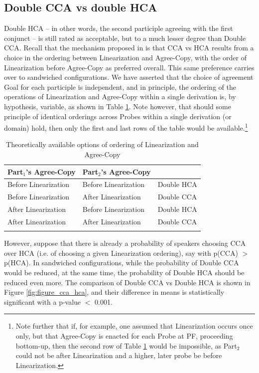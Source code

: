 \documentclass[output=paper
,modfonts
,nonflat]{langsci/langscibook}
\begin{document}
\subsection{Double CCA vs double HCA}
Double HCA -- in other words, the second participle agreeing with the first conjunct -- is still rated as acceptable, but to a much lesser degree than Double CCA.  Recall that the mechanism proposed in \citet{marusicnevinsbadecker:15} is that CCA vs HCA results from a choice in the ordering between Linearization and Agree-Copy, with the order of Linearization before Agree-Copy as preferred overall. This same preference carries over to sandwiched configurations. We have asserted that the choice of agreement Goal for each participle is independent, and in principle, the ordering of the operations of Linearization and Agree-Copy within a single derivation is, by hypothesis, variable, as shown in Table \ref{tab:order}. Note however, that should some principle of identical orderings across Probes within a single derivation (or domain) hold, then only the first and last rows of the table would be available.\footnote{Note further that if, for example, one assumed that Linearization occurs once only, but that Agree-Copy is enacted for each Probe at PF, proceeding bottom-up, then the second row of Table \ref{tab:order} would be impossible, as Part$_2$ could not be after Linearization and a higher, later probe be before Linearization.}

\begin{table}
\begin{tabularx}{\textwidth}{XXX} 
	\lsptoprule
Part$_1$'s Agree-Copy &  Part$_2$'s Agree-Copy &\\ \midrule
Before Linearization & Before Linearization & Double HCA\\ \midrule
Before Linearization & After Linearization& Double CCA\\ \midrule
After Linearization & Before Linearization& Double HCA\\ \midrule
After Linearization & After Linearization& Double CCA\\ 
\lspbottomrule
\end{tabularx}
\caption{Theoretically available options of ordering of Linearization and Agree-Copy}
\label{tab:order}
\end{table}
\newpage\noindent However, suppose that there is already a probability of speakers choosing CCA over HCA (i.e. of choosing a given Linearization ordering), say with p(CCA) $>$ p(HCA). In sandwiched configurations, while the probability of Double CCA would be reduced, at the same time, the probability of Double HCA should be reduced even more. 
The comparison of Double CCA vs Double HCA is shown in Figure \ref{fig:figure_cca_hca}, and their difference in means is statistically significant with a p-value $<$ 0.001.
\end{document}

